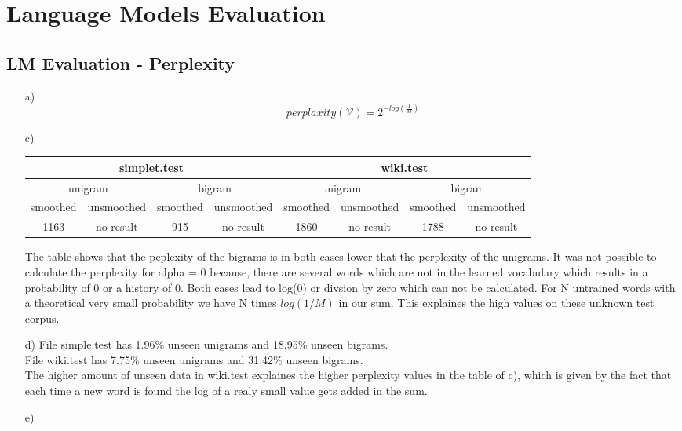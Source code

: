 \documentclass{article}
\begin{document}
\section{Language Models Evaluation}
\subsection{LM Evaluation - Perplexity}
\begin{itemize}
	\item[a)]
		$$perplaxity(\mathcal{V}) = 2^{-log(\frac{1}{M})}$$
	\item[c)]
		\begin{table}
		\begin{adjustbox}{width=\columnwidth,center}
		\begin{tabular}{|c|c|c|c||c|c|c|c|}
		\hline
		\multicolumn{4}{|c||}{simplet.test}&\multicolumn{4}{c|}{wiki.test}\\\hline\hline
		\multicolumn{2}{|c|}{unigram}&\multicolumn{2}{c||}{bigram}&\multicolumn{2}{c|}{unigram}&\multicolumn{2}{c|}{bigram}\\\hline
		smoothed & unsmoothed & smoothed & unsmoothed &smoothed & unsmoothed & smoothed & unsmoothed\\\hline
		1163&no result &915&no result&1860&no result&1788&no result\\\hline 
		\end{tabular}
		\end{adjustbox}
		\end{table}
		The table shows that the peplexity of the bigrams is in both cases lower that the perplexity of the unigrams. It was not possible to calculate the perplexity for alpha = 0 because, there are several words which are not in the learned vocabulary which results in a probability of 0 or a history of 0. Both cases lead to log(0) or divsion by zero which can not be calculated. For N untrained words with a theoretical very small probability we have N times $log(1/M)$ in our sum. This explaines the high values on these unknown test corpus. 
		\item[d)]
		File simple.test has 1.96\% unseen unigrams and 18.95\% unseen bigrams.\\
		File wiki.test has 7.75\% unseen unigrams and 31.42\% unseen bigrams.\\
		The higher amount of unseen data in wiki.test explaines the higher perplexity values in the table of c), which is given by the fact that each time a new word is found the log of a realy small value gets added in the sum.
		\item[e)]

\end{itemize}
\end{document}
